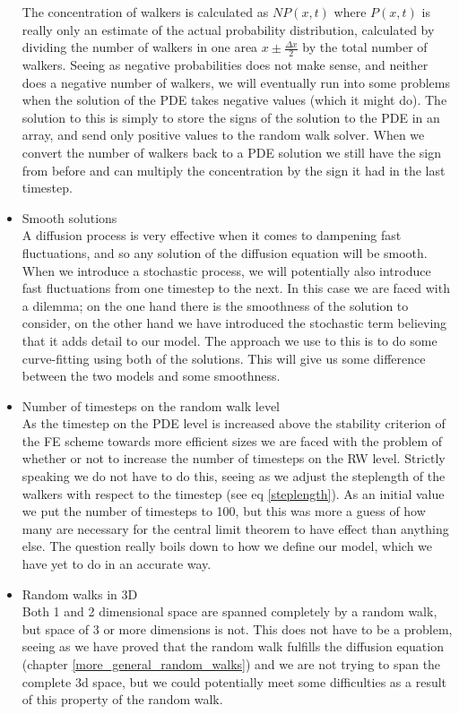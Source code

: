 \begin{itemize}
 The concentration of walkers is calculated as $NP(x,t)$ where $P(x,t)$ is really only an estimate of the actual probability distribution, calculated by dividing the number of walkers in one area $x\pm\frac{\Delta x}{2}$ by the total number of walkers. 
 Seeing as negative probabilities does not make sense, and neither does a negative number of walkers, we will eventually run into some problems when the solution of the PDE takes negative values (which it might do). 
 The solution to this is simply to store the signs of the solution to the PDE in an array, and send only positive values to the random walk solver. 
 When we convert the number of walkers back to a PDE solution we still have the sign from before and can multiply the concentration by the sign it had in the last timestep. 
 \item Smooth solutions\\
 A diffusion process is very effective when it comes to dampening fast fluctuations, and so any solution of the diffusion equation will be smooth. 
 When we introduce a stochastic process, we will potentially also introduce fast fluctuations from one timestep to the next. 
 In this case we are faced with a dilemma; on the one hand there is the smoothness of the solution to consider, on the other hand we have introduced the stochastic term believing that it adds detail to our model. 
 The approach we use to this is to do some curve-fitting using both of the solutions. 
 This will give us some difference between the two models and some smoothness.
 \item Number of timesteps on the random walk level\\
 As the timestep on the PDE level is increased above the stability criterion of the FE scheme towards more efficient sizes we are faced with the problem of whether or not to increase the number of timesteps on the RW level. 
 Strictly speaking we do not have to do this, seeing as we adjust the steplength of the walkers with respect to the timestep (see eq \ref{steplength}). 
 As an initial value we put the number of timesteps to 100, but this was more a guess of how many are necessary for the central limit theorem to have effect than anything else. 
 The question really boils down to how we define our model, which we have yet to do in an accurate way.
 \item Random walks in 3D\\
 Both 1 and 2 dimensional space are spanned completely by a random walk, but space of 3 or more dimensions is not. 
 This does not have to be a problem, seeing as we have proved that the random walk fulfills the diffusion equation (chapter \ref{more_general_random_walks}) and we are not trying to span the complete 3d space, but we could potentially meet some difficulties as a result of this property of the random walk.
\end{itemize}

